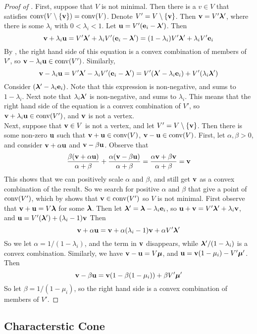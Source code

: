 \begin{proof}[Proof of ]
	First, suppose that $V$ is not minimal.  Then there is a $v\in V$ that satisfies $\operatorname{conv}(V\setminus\left\{\mathbf{v}\right\}) = \operatorname{conv}(V)$.  Denote $V'=V\setminus\left\{\mathbf{v}\right\}$.  Then $\mathbf{v}=V'\bm{\lambda}'$, where there is some $\lambda_i$ with $0 < \lambda_i < 1$.  Let $\mathbf{u} = V'(\mathbf{e}_i-\bm{\lambda}')$.  Then
	\[ \mathbf{v}+\lambda_i\mathbf{u} = V'\bm{\lambda}' + \lambda_iV'(\mathbf{e}_i-\bm{\lambda}')
		= (1-\lambda_i)V'\bm{\lambda}' + \lambda_iV'\mathbf{e}_i\]
	By , the right hand side of this equation is a convex combination of members of $V'$, so $\mathbf{v}-\lambda_i\mathbf{u} \in \operatorname{conv}(V')$.   Similarly,
	\[ \mathbf{v}-\lambda_i\mathbf{u} = V'\bm{\lambda}' - \lambda_iV'(\mathbf{e}_i-\bm{\lambda}') = 
      V'(\bm{\lambda}'-\lambda_i\mathbf{e}_i) + V'(\lambda_i\bm{\lambda}') \]
	Consider $(\bm{\lambda}'-\lambda_i\mathbf{e}_i)$.  Note that this expression is non-negative, and sums to $1-\lambda_i$.  Next note that $\lambda_i\bm{\lambda}'$ is non-negative, and sums to $\lambda_i$.  This means that the right hand side of the equation is a convex combination of $V'$, so $\mathbf{v}+\lambda_i\mathbf{u}\in\operatorname{conv}(V')$, and $\mathbf{v}$ is not a vertex.\\
	Next, suppose that $\mathbf{v}\in V$ is not a vertex, and let $V'=V\setminus\left\{\mathbf{v}\right\}$.  Then there is some non-zero $\mathbf{u}$ such that $\mathbf{v}+\mathbf{u}\in\operatorname{conv}(V)$, $\mathbf{v}-\mathbf{u}\in\operatorname{conv}(V)$.  First, let $\alpha,\beta > 0$, and consider $\mathbf{v}+\alpha\mathbf{u}$ and $\mathbf{v}-\beta\mathbf{u}$.  Observe that
	\[ \frac{\beta(\mathbf{v}+\alpha\mathbf{u})}{\alpha+\beta} + \frac{\alpha(\mathbf{v}-\beta\mathbf{u})}{\alpha+\beta} =
		\frac{\alpha\mathbf{v}+\beta\mathbf{v}}{\alpha+\beta} = \mathbf{v} \]
	This shows that we can positively scale $\alpha$ and $\beta$, and still get $\mathbf{v}$ as a convex combination of the result.  So we search for positive $\alpha$ and $\beta$ that give a point of $\operatorname{conv}(V')$, which by  shows that $\mathbf{v}\in\operatorname{conv}(V')$ so $V$ is not minimal.  First observe that $\mathbf{v}+\mathbf{u} = V\bm{\lambda}$ for some $\bm{\lambda}$.  Then let $\bm{\lambda}' = \bm{\lambda} - \lambda_i\mathbf{e}_i$, so $\mathbf{u}+\mathbf{v} = V'\bm{\lambda}' + \lambda_i\mathbf{v}$, and $\mathbf{u} = V'(\bm{\lambda}') + (\lambda_i-1)\mathbf{v}$  Then
	\[ \mathbf{v} + \alpha\mathbf{u} = \mathbf{v} + \alpha(\lambda_i-1)\mathbf{v} + \alpha V'\bm{\lambda}' \]
	So we let $\alpha = 1/(1-\lambda_i)$, and the term in $\mathbf{v}$ disappears, while $\bm{\lambda}'/(1-\lambda_i)$ is a convex combination.  Similarly, we have $\mathbf{v}-\mathbf{u} = V\bm{\mu}$, and $\mathbf{u} = \mathbf{v}(1-\mu_i)-V'\bm{\mu}'$.  Then
	\[\mathbf{v} - \beta\mathbf{u} = \mathbf{v}(1-\beta(1-\mu_i)) + \beta V'\bm{\mu}' \]
	So let $\beta = 1/(1-\mu_i)$, so the right hand side is a convex combination of members of $V'$.
\end{proof}

\subsection{Characterstic Cone}

